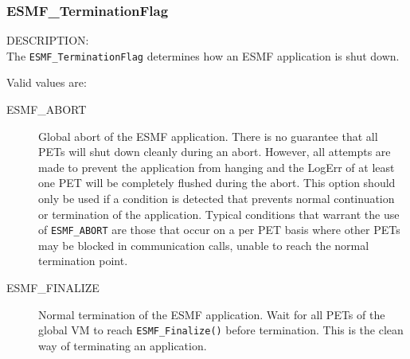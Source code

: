 
\subsubsection{ESMF\_TerminationFlag}
\label{app:terminationflag}

{\sf DESCRIPTION:\\}
The {\tt ESMF\_TerminationFlag} determines how an ESMF application is shut down.

Valid values are:
\begin{description}
   \item [ESMF\_ABORT] 
         Global abort of the ESMF application. There is no guarantee 
         that all PETs will shut down cleanly during an abort. However, all
         attempts are made to prevent the application from hanging and the
         LogErr of at least one PET will be completely flushed during the abort.
         This option should only be used if a condition is detected that
         prevents normal continuation or termination of the application.
         Typical conditions that warrant the use of {\tt ESMF\_ABORT} are those
         that occur on a per PET basis where other PETs may be blocked in 
         communication calls, unable to reach the normal termination point.
   \item [ESMF\_FINALIZE]
         Normal termination of the ESMF application. Wait for all PETs of the
         global VM to reach {\tt ESMF\_Finalize()} before termination. This is
         the clean way of terminating an application.
\end{description}
